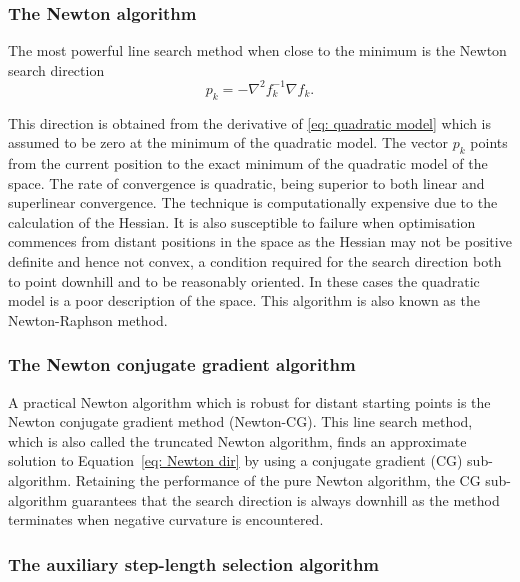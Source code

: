 \subsubsection{The Newton algorithm}

The most powerful line search method when close to the minimum is the Newton search direction
\begin{equation} \label{eq: Newton dir}
 p_k = - \nabla^2 f_k^{-1} \nabla f_k.
\end{equation}

\noindent This direction is obtained from the derivative of \eqref{eq: quadratic model} which is assumed to be zero at the minimum of the quadratic model.  The vector $p_k$ points from the current position to the exact minimum of the quadratic model of the space.  The rate of convergence is quadratic, being superior to both linear and superlinear convergence.  The technique is computationally expensive due to the calculation of the Hessian.  It is also susceptible to failure when optimisation commences from distant positions in the space as the Hessian may not be positive definite and hence not convex, a condition required for the search direction both to point downhill and to be reasonably oriented.  In these cases the quadratic model is a poor description of the space.
This algorithm is also known as the Newton-Raphson method.


\subsubsection{The Newton conjugate gradient algorithm}

A practical Newton algorithm which is robust for distant starting points is the Newton conjugate gradient method (Newton-CG).  This line search method, which is also called the truncated Newton algorithm, finds an approximate solution to Equation~\eqref{eq: Newton dir} by using a conjugate gradient (CG) sub-algorithm.  Retaining the performance of the pure Newton algorithm, the CG sub-algorithm guarantees that the search direction is always downhill as the method terminates when negative curvature is encountered.


\subsubsection{The auxiliary step-length selection algorithm}

